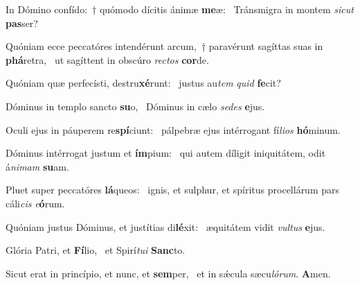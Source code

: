 \item In Dómino confído:~† quómodo dícitis ánimæ \textbf{me}æ:~\psstar{} Tránsmigra in montem \textit{sicut} \textbf{pas}ser?
\item Quóniam ecce peccatóres intendérunt arcum,~† paravérunt sagíttas suas in \textbf{phá}retra,~\psstar{} ut sagíttent in obscúro \textit{rectos} \textbf{cor}de.
\item Quóniam quæ perfecísti, destru\textbf{xé}runt:~\psstar{} justus au\textit{tem} \textit{quid} \textbf{fe}cit?
\item Dóminus in templo sancto \textbf{su}o,~\psstar{} Dóminus in cælo \textit{sedes} \textbf{e}jus.
\item Oculi ejus in páuperem re\textbf{spí}ciunt:~\psstar{} pálpebræ ejus intérrogant fí\textit{lios} \textbf{hó}minum.
\item Dóminus intérrogat justum et \textbf{ím}pium:~\psstar{} qui autem díligit iniquitátem, odit á\textit{nimam} \textbf{su}am.
\item Pluet super peccatóres \textbf{lá}queos:~\psstar{} ignis, et sulphur, et spíritus procellárum pars cáli\textit{cis} \textit{e}\textbf{ó}rum.
\item Quóniam justus Dóminus, et justítias di\textbf{lé}xit:~\psstar{} æquitátem vidit \textit{vultus} \textbf{e}jus.
\item Glória Patri, et \textbf{Fí}lio,~\psstar{} et Spirí\textit{tui} \textbf{Sanc}to.
\item Sicut erat in princípio, et nunc, et \textbf{sem}per,~\psstar{} et in sǽcula sæcu\textit{lórum}. \textbf{A}men.

